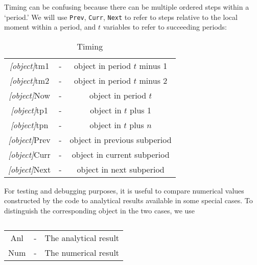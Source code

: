Timing can be confusing because there can be multiple ordered steps
within a `period.'  We will use \texttt{Prev}, \texttt{Curr}, \texttt{Next} to refer
to steps relative to the local moment within a period, and $t$ variables to refer to succeeding periods:
\begin{table}[h]
	\centering
	\begin{tabular}{||>{\ttfamily}ccc||}
		\hline
   \textit{[object]}tm1 & - & object in period $t$ minus 1
\\ \textit{[object]}tm2 & - & object in period $t$ minus 2
\\ \textit{[object]}Now & - & object in period $t$
\\ \textit{[object]}tp1 & - & object in $t$ plus 1
\\ \textit{[object]}tpn & - & object in $t$ plus $n$
\\ \textit{[object]}Prev & - & object in previous subperiod
\\ \textit{[object]}Curr & - & object in current subperiod
\\ \textit{[object]}Next & - & object in next subperiod
\\	\hline
	\end{tabular}
	\caption{Timing}
	\label{table:Timing}
\end{table}

For testing and debugging purposes, it is useful to compare numerical
values constructed by the code to analytical results available in some
special cases.  To distinguish the corresponding object in the two cases,
we use
\begin{table}[h]
	\centering
	\begin{tabular}{||>{\ttfamily}ccc||}
		\hline
Anl & - & The analytical result
\\ Num & - & The numerical result
\\ \hline
	\end{tabular}
	\caption{}
	\label{table:AnlVsNum}
\end{table}


